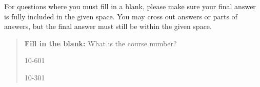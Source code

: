 \documentclass[11pt,addpoints,answers]{exam}
\begin{document}
For questions where you must fill in a blank, please make sure your final answer is fully included in the given space. You may cross out answers or parts of answers, but the final answer must still be within the given space.

\begin{quote}
\textbf{Fill in the blank:} What is the course number?

\begin{tcolorbox}[fit,height=1cm, width=4cm, blank, borderline={1pt}{-2pt},nobeforeafter]
    \begin{center}\huge10-601\end{center}
    \end{tcolorbox}\hspace{2cm}
    \begin{tcolorbox}[fit,height=1cm, width=4cm, blank, borderline={1pt}{-2pt},nobeforeafter]
    \begin{center}\huge10-301\end{center}
    \end{tcolorbox}
\end{quote}
\clearpage
\end{document}

